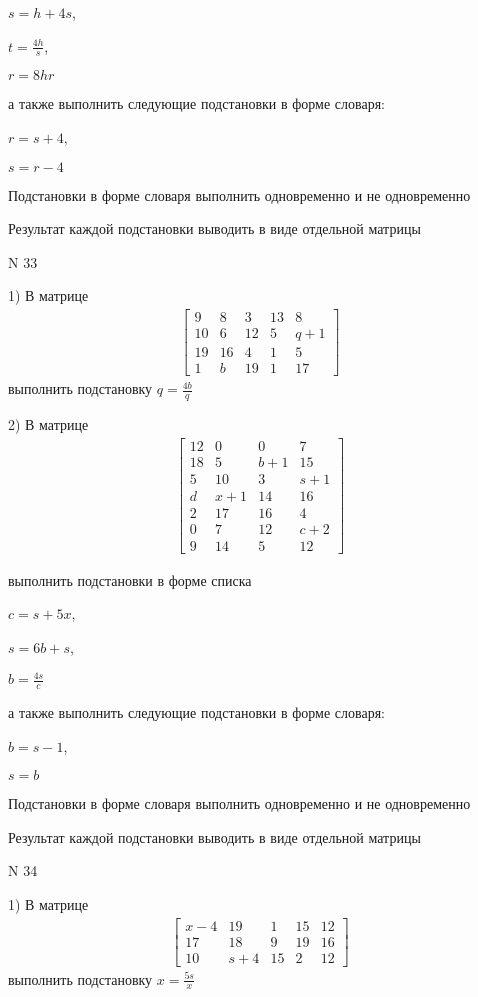 \documentclass[11pt]{report}
\begin{document}
$s=h + 4 s$,

$t=\frac{4 h}{s}$,

$r=8 h r$

а также выполнить следующие подстановки в форме словаря:

$r=s + 4$,

$s=r - 4$


    Подстановки в форме словаря выполнить одновременно и не одновременно


    Результат каждой подстановки выводить в виде отдельной матрицы

\newpage
N 33


    1) В матрице
\begin{align*}
\left[\begin{matrix}9 & 8 & 3 & 13 & 8\\10 & 6 & 12 & 5 & q + 1\\19 & 16 & 4 & 1 & 5\\1 & b & 19 & 1 & 17\end{matrix}\right]
\end{align*}
выполнить подстановку $q=\frac{4 b}{q}$


    2) В матрице
\begin{align*}
\left[\begin{matrix}12 & 0 & 0 & 7\\18 & 5 & b + 1 & 15\\5 & 10 & 3 & s + 1\\d & x + 1 & 14 & 16\\2 & 17 & 16 & 4\\0 & 7 & 12 & c + 2\\9 & 14 & 5 & 12\end{matrix}\right]
\end{align*}

выполнить подстановки в форме списка

$c=s + 5 x$,

$s=6 b + s$,

$b=\frac{4 s}{c}$

а также выполнить следующие подстановки в форме словаря:

$b=s - 1$,

$s=b$


    Подстановки в форме словаря выполнить одновременно и не одновременно


    Результат каждой подстановки выводить в виде отдельной матрицы

\newpage
N 34


    1) В матрице
\begin{align*}
\left[\begin{matrix}x - 4 & 19 & 1 & 15 & 12\\17 & 18 & 9 & 19 & 16\\10 & s + 4 & 15 & 2 & 12\end{matrix}\right]
\end{align*}
выполнить подстановку $x=\frac{5 s}{x}$
\end{document}
